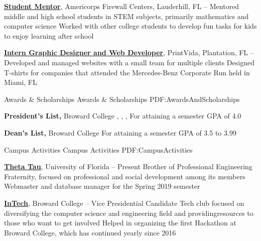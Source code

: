 \documentclass[letterpaper,MMMyyyy,nonstopmode]{resume}
\begin{document}
\begin{Body}
\BigGap
\Entry
\href{http://www.example.com/my-company}
{\textbf{Student Mentor}},
Americorps Firewall Centers,
Lauderhill, FL
\hfill
{} --
\Gap
\BulletItem
Mentored middle and high school students in STEM subjects, primarily mathematics and computer science
\BulletItem
Worked with other college students to develop fun tasks for kids to enjoy learning after school

\BigGap
\Entry
\href{http://www.example.com/my-company}
{\textbf{Intern Graphic Designer and Web Developer}},
PrintVida,
Plantation, FL
\hfill
{} --
\Gap
\BulletItem
Developed and managed websites with a small team for multiple clients
\BulletItem
Designed T-shirts for companies that attended the Mercedes-Benz Corporate Run held in Miami, FL


\Section
{Awards \&\newline
Scholarships}
{Awards \& Scholarships}
{PDF:AwardsAndScholarships}

\Entry
\textbf{President's List,}
Broward College
\hfill
{}, 
,
, 
\Gap
\BulletItem
For attaining a semester GPA of 4.0

\BigGap

\Entry
\textbf{Dean's List,}
Broward College
\hfill
{}
\Gap
\BulletItem
For attaining a semester GPA of 3.5 to 3.99


\Section
{Campus Activities}
{Campus Activities}
{PDF:CampusActivities}

\Entry
\href{https://ufthetatau.org/}
{\textbf{Theta Tau}},
University of Florida
\hfill
{} --
Present
\Gap
\BulletItem
Brother of Professional Engineering Fraternity, focused on professional and social development among its members
\BulletItem
Webmaster and database manager for the Spring 2019 semester

\BigGap

\Entry
\href{https://cse.broward.edu/intech/index.php/about-us/}
{\textbf{InTech}},
Broward College
\hfill
{} --
\Gap
\BulletItem
Vice Presidential Candidate
\BulletItem
Tech club focused on diversifying the computer science and engineering field and providing\newline resources to those who want to get involved
\BulletItem
Helped in organizing the first Hackathon at Broward College, which has continued yearly since 2016


\end{Body}
\end{document}
